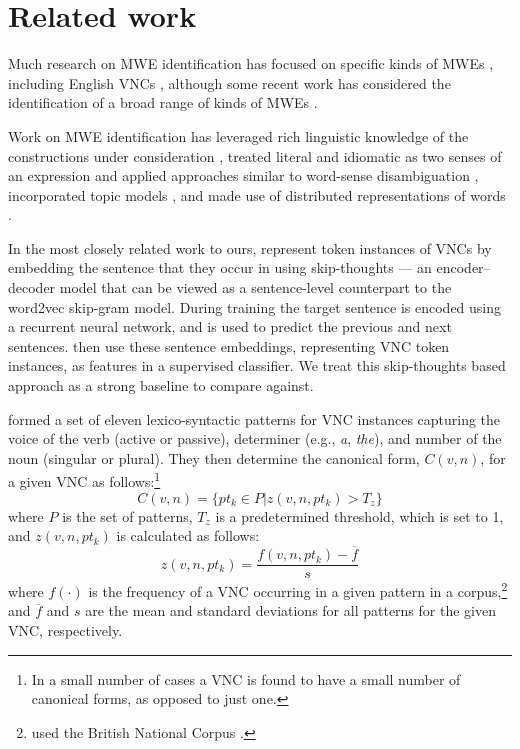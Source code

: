 \documentclass[11pt,a4paper]{article}
\begin{document}
\section{Related work} \label{related}



Much research on MWE identification has focused on specific kinds of
MWEs \citep[e.g.,][]{Patrick2005, Uchiyama2005}, including English
VNCs \citep[e.g.,][]{Fazly2009,salton-ross-kelleher}, although some
recent work has considered the identification of a broad range of
kinds of MWEs
\citep[e.g.,][]{Schneider+:2014,Brooke+:2014,savary-EtAl:2017:MWE2017}.

Work on MWE identification has leveraged rich linguistic knowledge of
the constructions under consideration
\citep[e.g.,][]{Fazly2009,Fothergill:Baldwin:2012}, treated literal
and idiomatic as two senses of an expression and applied approaches
similar to word-sense disambiguation
\citep[e.g.,][]{Birke2006,Hashimoto:Kawahara:2008}, incorporated topic
models \citep[e.g.,][]{Li+:2010}, and made use of distributed
representations of words \citep{gharbieh+:2016}.


In the most closely related work to ours,
 represent token instances of VNCs by
embedding the sentence that they occur in using skip-thoughts
\citep{Kiros+:2015} --- an encoder--decoder model that can be viewed
as a sentence-level counterpart to the word2vec \citep{mikolov+:2013b}
skip-gram model. During training the target sentence is encoded using
a recurrent neural network, and is used to predict the previous and
next sentences. \citeauthor{salton-ross-kelleher} then use these
sentence embeddings, representing VNC token instances, as features in
a supervised classifier.  We treat this skip-thoughts based approach
as a strong baseline to compare against.








 formed a set of eleven lexico-syntactic patterns
for VNC instances capturing the voice of the verb (active or passive),
determiner (e.g., \emph{a}, \emph{the}), and number of the noun
(singular or plural).  They then determine the canonical form,
$C(v,n)$, for a given VNC as follows:\footnote{In a small number of
  cases a VNC is found to have a small number of canonical forms, as
  opposed to just one.}
\begin{equation}
C(v,n) = \{ pt_k \in P | z(v,n,pt_k) > T_z \}
\end{equation}
\noindent
where $P$ is the set of patterns, $T_z$ is a predetermined threshold,
which is set to 1, and $z(v,n,pt_k)$ is calculated as follows:
\begin{equation}
z(v,n,pt_k)= \frac{f(v,n,pt_k)-\overline{f}}{s}
\end{equation}
\noindent
where $f(\cdot)$ is the frequency of a VNC occurring in a given
pattern in a corpus,\footnote{ used the British
  National Corpus \citep{Burnard2000}.} and $\overline{f}$ and $s$ are
the mean and standard deviations for all patterns for the given VNC,
respectively.
\end{document}
